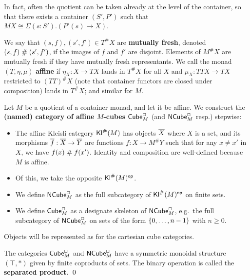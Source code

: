 \documentclass[a4paper]{memoir}
\begin{document}
\begin{remark}
In fact, often the quotient can be taken already at the level of the container, so that there exists a container $(S', P')$ such that $MX \cong \Sigma(s : S').(P'(s) \to X)$.
\end{remark}

We say that $(s, f), (s', f') \in T^\# X$ are \textbf{mutually fresh}, denoted $(s, f) \mathrel{\#} (s', f')$, if the images of $f$ and $f'$ are disjoint.
Elements of $M^\# X$ are mutually fresh if they have mutually fresh representants.
We call the monad $(T, \eta, \mu)$ \textbf{affine} if $\eta_X : X \to TX$ lands in $T^\# X$ for all $X$ and $\mu_X : TTX \to TX$ restricted to $(TT)^\# X$ (note that container functors are closed under composition) lands in $T^\# X$; and similar for $M$.

\begin{definition}
Let $M$ be a quotient of a container monad, and let it be affine.
We construct the \textbf{(named) category of affine $M$-cubes ${\mathsf{Cube}}_M^\Box$} (and ${\mathsf{NCube}}_M^\Box$ resp.) stepwise:
\begin{itemize}
	\item The affine Kleisli category ${\mathsf{Kl}}^\#(M)$ has objects ${\overline{X}}$ where $X$ is a set, and its morphisms ${\overline{f}} : {\overline{X}} \to {\overline{Y}}$ are functions $f : X \to M^\#Y$ such that for any $x \neq x'$ in $X$, we have $f(x) \mathrel{\#} f(x')$.
	Identity and composition are well-defined because $M$ is affine.
	\item Of this, we take the opposite ${\mathsf{Kl}}^\#(M)^{\mathsf{op}}$.
	\item We define ${\mathsf{NCube}}_M^\Box$ as the full subcategory of ${\mathsf{Kl}}^\#(M)^{\mathsf{op}}$ on finite sets.
	\item We define ${\mathsf{Cube}}_M^\Box$ as a designate skeleton of ${\mathsf{NCube}}^\Box_M$, e.g.\ the full subcategory of ${\mathsf{NCube}}^\Box_M$ on sets of the form $\mathopen{}\left\{ 0, \ldots, n-1 \right\}\mathclose{}$ with $n \geq 0$.
\end{itemize}
\end{definition}
Objects will be represented as for the cartesian cube categories.

\begin{corollary}
The categories ${\mathsf{Cube}}^\Box_M$ and ${\mathsf{NCube}}^\Box_M$ have a symmetric monoidal structure $(\top, {*})$ given by finite coproducts of sets. The binary operation is called the \textbf{separated product}. \qed
\end{corollary}
\end{document}
